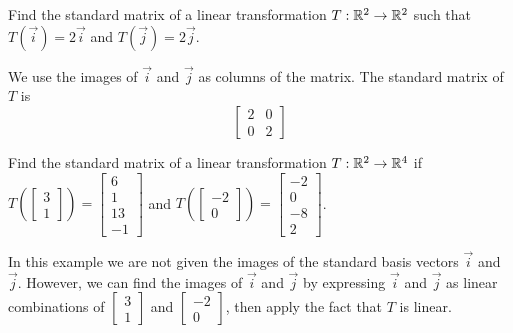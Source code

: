 \documentclass{ximera}
\begin{document}
 \begin{example}\label{ex:findmatrix}
Find the standard matrix of a linear transformation $T:\mathbb{R}^2\rightarrow \mathbb{R}^2$ such that $T(\vec{i})=2\vec{i}$ and $T(\vec{j})=2\vec{j}$.  
\begin{explanation}
We use the images of $\vec{i}$ and $\vec{j}$ as columns of the matrix.  The standard matrix of $T$ is
$$\begin{bmatrix}2&0\\0&2\end{bmatrix}$$
\end{explanation}
\end{example}
 
 \begin{example}
 Find the standard matrix of a linear transformation $T:\mathbb{R}^2\rightarrow \mathbb{R}^4$ if $T\left(\begin{bmatrix}3\\1\end{bmatrix}\right)=\begin{bmatrix}6\\1\\13\\-1\end{bmatrix}$ and $T\left(\begin{bmatrix}-2\\0\end{bmatrix}\right)=\begin{bmatrix}-2\\0\\-8\\2\end{bmatrix}$.  
\begin{explanation}
In this example we are not given the images of the standard basis vectors $\vec{i}$ and $\vec{j}$.  However, we can find the images of $\vec{i}$ and $\vec{j}$ by expressing $\vec{i}$ and $\vec{j}$ as linear combinations of $\begin{bmatrix}3\\1\end{bmatrix}$ and $\begin{bmatrix}-2\\0\end{bmatrix}$, then apply the fact that $T$ is linear.


\end{explanation}
\end{example}
\end{document}
